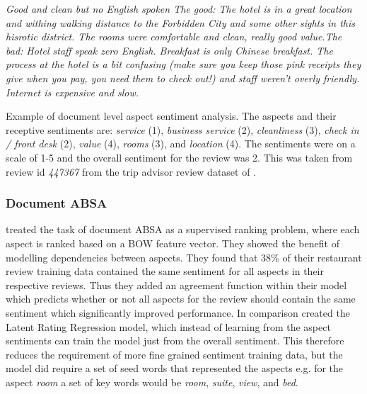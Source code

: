 
\begin{example}
\textit{Good and clean but no English spoken The good: The hotel is in a great location and withing walking distance to the Forbidden City and some other sights in this hisrotic district. The rooms were comfortable and clean, really good value.The bad: Hotel staff speak zero English. Breakfast is only Chinese breakfast. The process at the hotel is a bit confusing (make sure you keep those pink receipts they give when you pay, you need them to check out!) and staff weren't overly friendly. Internet is expensive and slow.}
\caption{Example of document level aspect sentiment analysis. The aspects and their receptive sentiments are: \textit{service} (1), \textit{business service} (2), \textit{cleanliness} (3), \textit{check in / front desk} (2), \textit{value} (4), \textit{rooms} (3), and \textit{location} (4). The sentiments were on a scale of 1-5 and the overall sentiment for the review was 2. This was taken from review id \textit{447367} from the trip advisor review dataset of \citet{Wang2010LatentAR}.}
\label{example:lit_review_document_aspect_sentiment}
\end{example}

\subsubsection{Document ABSA}
\label{lit_review_document_ABSA}

\citet{snyder-barzilay-2007-multiple} treated the task of document ABSA as a supervised ranking problem, where each aspect is ranked based on a BOW feature vector. They showed the benefit of modelling dependencies between aspects. They found that 38\% of their restaurant review training data contained the same sentiment for all aspects in their respective reviews. Thus they added an agreement function within their model which predicts whether or not all aspects for the review should contain the same sentiment which significantly improved performance. In comparison \citet{Wang2010LatentAR} created the Latent Rating Regression model, which instead of learning from the aspect sentiments can train the model just from the overall sentiment. This therefore reduces the requirement of more fine grained sentiment training data, but the model did require a set of seed words that represented the aspects e.g. for the aspect \textit{room} a set of key words would be \textit{room}, \textit{suite}, \textit{view}, and \textit{bed}. 

